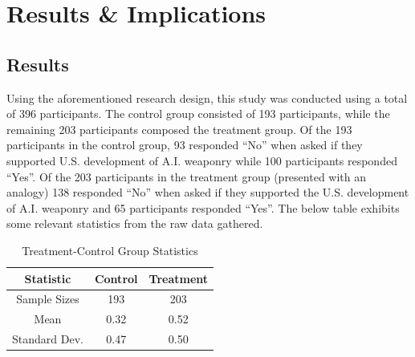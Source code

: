 \documentclass[12pt]{article}
\begin{document}
\section {Results \& Implications}
\subsection {Results}
Using the aforementioned research design, this study was conducted using a total of 396 participants. The control group consisted of 193 participants, while the remaining 203 participants composed the treatment group. Of the 193 participants in the control group, 93 responded “No” when asked if they supported U.S. development of A.I. weaponry while 100 participants responded “Yes”. Of the 203 participants in the treatment group (presented with an analogy) 138 responded “No” when asked if they supported the U.S. development of A.I. weaponry and 65 participants responded “Yes”.
\bigbreak
The below table exhibits some relevant statistics from the raw data gathered. 

\begin {table} [!ht]
  \centering
  \begin {tabular} {c|c|c}
    Statistic&Control&Treatment \\
    \hline
    Sample Sizes&193&203 \\
    Mean&0.32&0.52 \\
    Standard Dev.&0.47&0.50 \\
  \end {tabular}
  \caption {Treatment-Control Group Statistics}
\end {table}
\end{document}
